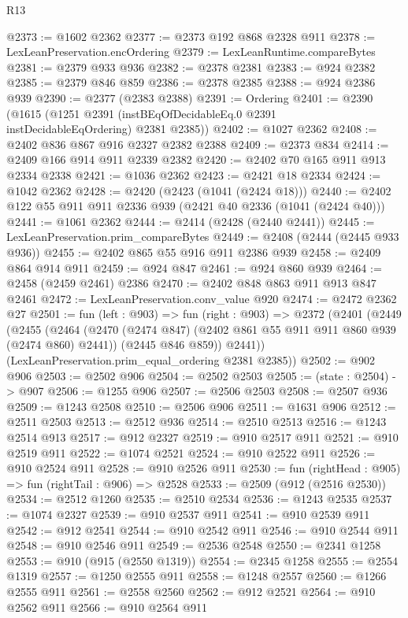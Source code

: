 \begin{lexlean}{R13}
\begin{coremodule}
@2373 := @1602 @2362
@2377 := @2373 @192 @868 @2328 @911
@2378 := LexLeanPreservation.encOrdering
@2379 := LexLeanRuntime.compareBytes
@2381 := @2379 @933 @936
@2382 := @2378 @2381
@2383 := @924 @2382
@2385 := @2379 @846 @859
@2386 := @2378 @2385
@2388 := @924 @2386 @939
@2390 := @2377 (@2383 @2388)
@2391 := Ordering
@2401 := @2390
    (@1615 (@1251 @2391 (instBEqOfDecidableEq.{0} @2391 instDecidableEqOrdering) @2381 @2385))
@2402 := @1027 @2362
@2408 := @2402 @836 @867 @916 @2327 @2382 @2388
@2409 := @2373 @834
@2414 := @2409 @166 @914 @911 @2339 @2382
@2420 := @2402 @70 @165 @911 @913 @2334 @2338
@2421 := @1036 @2362
@2423 := @2421 @18 @2334
@2424 := @1042 @2362
@2428 := @2420 (@2423 (@1041 (@2424 @18)))
@2440 := @2402 @122 @55 @911 @911 @2336 @939 (@2421 @40 @2336 (@1041 (@2424 @40)))
@2441 := @1061 @2362
@2444 := @2414 (@2428 (@2440 @2441))
@2445 := LexLeanPreservation.prim_compareBytes
@2449 := @2408 (@2444 (@2445 @933 @936))
@2455 := @2402 @865 @55 @916 @911 @2386 @939
@2458 := @2409 @864 @914 @911
@2459 := @924 @847
@2461 := @924 @860 @939
@2464 := @2458 (@2459 @2461) @2386
@2470 := @2402 @848 @863 @911 @913 @847 @2461
@2472 := LexLeanPreservation.conv_value @920
@2474 := @2472 @2362 @27
@2501 := fun (left : @903) =>
  fun (right : @903) =>
  @2372
    (@2401
      (@2449
        (@2455
          (@2464
            (@2470 (@2474 @847) (@2402 @861 @55 @911 @911 @860 @939 (@2474 @860) @2441))
            (@2445 @846 @859))
          @2441))
      (LexLeanPreservation.prim_equal_ordering @2381 @2385))
@2502 := @902 @906
@2503 := @2502 @906
@2504 := @2502 @2503
@2505 := (state : @2504) -> @907
@2506 := @1255 @906
@2507 := @2506 @2503
@2508 := @2507 @936
@2509 := @1243 @2508
@2510 := @2506 @906
@2511 := @1631 @906
@2512 := @2511 @2503
@2513 := @2512 @936
@2514 := @2510 @2513
@2516 := @1243 @2514 @913
@2517 := @912 @2327
@2519 := @910 @2517 @911
@2521 := @910 @2519 @911
@2522 := @1074 @2521
@2524 := @910 @2522 @911
@2526 := @910 @2524 @911
@2528 := @910 @2526 @911
@2530 := fun (rightHead : @905) => fun (rightTail : @906) => @2528
@2533 := @2509 (@912 (@2516 @2530))
@2534 := @2512 @1260
@2535 := @2510 @2534
@2536 := @1243 @2535
@2537 := @1074 @2327
@2539 := @910 @2537 @911
@2541 := @910 @2539 @911
@2542 := @912 @2541
@2544 := @910 @2542 @911
@2546 := @910 @2544 @911
@2548 := @910 @2546 @911
@2549 := @2536 @2548
@2550 := @2341 @1258
@2553 := @910 (@915 (@2550 @1319))
@2554 := @2345 @1258
@2555 := @2554 @1319
@2557 := @1250 @2555 @911
@2558 := @1248 @2557
@2560 := @1266 @2555 @911
@2561 := @2558 @2560
@2562 := @912 @2521
@2564 := @910 @2562 @911
@2566 := @910 @2564 @911

\end{coremodule}
\end{lexlean}
